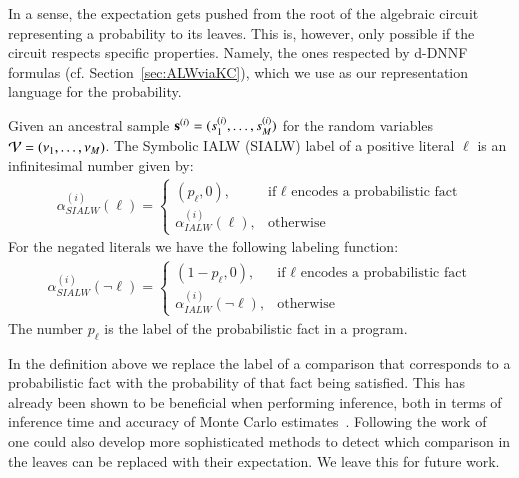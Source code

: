 In a sense, the expectation gets pushed from the root of the algebraic circuit representing a probability to its leaves. This is, however, only possible if the circuit respects specific properties. Namely, the ones respected by \mbox{d-DNNF} formulas (cf. Section~\ref{sec:ALWviaKC}), which we use as our representation language for the probability.


\begin{definition} \label{def:sample_probability_labeling_function}
Given an ancestral sample $\mathbf{s}^{(i)}= (s_1^{(i)}, \dots,  s_M^{(i)} ) $ for the random variables $\mathcal{V} = (\nu_1,\dots, \nu_M)$.
The  Symbolic IALW (SIALW) label of a positive literal $\ell$ is an infinitesimal number given by:
\begin{align}
    \alpha_{SIALW}^{(i)}( \ell)
    =\begin{cases}
    (p_{\ell}, 0), & \text{if $\ell$ encodes a probabilistic fact} \\
    \alpha^{(i)}_{IALW}(\ell), & \text{otherwise} 
    \end{cases}
    \nonumber
\end{align}
For the negated literals we have the following labeling function:
\begin{align}
    \alpha_{SIALW}^{(i)}( \neg \ell)
    =\begin{cases}
    (1{-}p_{\ell}, 0), & \text{if $\ell$ encodes a probabilistic fact} \\
    \alpha^{(i)}_{IALW}(\neg \ell), & \text{otherwise}
    \end{cases}
    \nonumber
\end{align}
The number $p_\ell$ is the label of the probabilistic fact in a \dcproblogsty program.
\end{definition}

In the definition above we replace the label of a comparison that corresponds to a probabilistic fact with the probability of that fact being satisfied. This has already been shown to be beneficial when performing inference, both in terms of inference time and accuracy of Monte Carlo estimates~\citep{zuidbergdosmartires2019exact}. Following the work of~\citep{kolb2019exploit} one could also develop more sophisticated methods to detect which comparison in the leaves can be replaced with their expectation. We leave this for future work.








